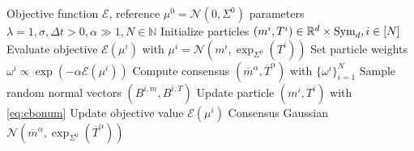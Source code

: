 \documentclass{article}
\theoremstyle{plain}
\theoremstyle{definition}
\theoremstyle{remark}
\newcommand{\Rd}{ {\mathbb{R}^d}}
\newcommand{\E}{\mathcal{E}}
\newcommand{\sym}{\textup{Sym}_d}
\begin{document}
\begin{algorithm}[tb]
  \caption{Gaussian Consensus-Based Optimization}
  \label{alg:gcbo}
  \begin{algorithmic}
     Objective function $\mathcal{E}$, reference $\mu^0 = \mathcal{N}(0, \Sigma^0)$ 
    \STATE \hspace{10mm} parameters $\lambda = 1, \sigma,\Delta t >0, \alpha \gg1, N \in \mathbb{N}$
    \STATE  Initialize particles $(m^i, T^i)\in \Rd\times \sym, i \in [N]$
    \STATE Evaluate objective $\E(\mu^i)$ with $\mu^i = \mathcal{N}(m^i, \exp_{\Sigma^0}(T^i))$
    \REPEAT
    \STATE Set particle weights $\omega^i \propto \exp(-\alpha \E(\mu^i))$
    \STATE Compute consensus  $(\overline{m}^\alpha, \overline{T}^\alpha)$ with $\{\omega^i\}_{i = 1}^N$
    \STATE Sample random normal vectors $(B^{i,m}, B^{i,T})$ 
    \STATE Update particle $(m^i, T^i)$ with \eqref{eq:cbonum}
    \STATE Update objective value $\E(\mu^i)$
    \ENDFOR
     Consensus Gaussian $\mathcal{N}(\overline{m}^\alpha, \exp_{\Sigma^0}(\overline{T}^\alpha))$
  \end{algorithmic}
\end{algorithm}


\renewcommand\thesubfigure{\Alph{subfigure}} %
\end{document}
